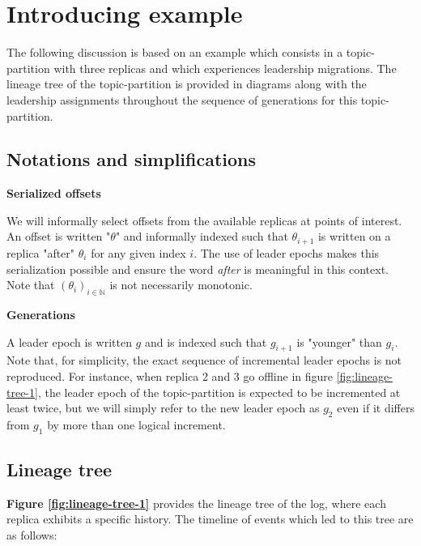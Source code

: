\documentclass{article}
\begin{document}
\section{Introducing example}

The following discussion is based on an example which consists in a topic-partition with three replicas and which experiences leadership migrations. The lineage tree of the topic-partition is provided in diagrams along with the leadership assignments throughout the sequence of generations for this topic-partition.

\subsection{Notations and simplifications}

\textbf{Serialized offsets}

We will informally select offsets from the available replicas at points of interest. An offset is written "$\theta$" and informally indexed such that $\theta_{i+1}$ is written on a replica "after" $\theta_i$ for any given index $i$. The use of leader epochs makes this serialization possible and ensure the word \textit{after} is meaningful in this context. Note that $(\theta_i)_{i \in \mathbb{N}}$ is not necessarily monotonic. 

\textbf{Generations}

A leader epoch is written $g$ and is indexed such that $g_{i+1}$ is "younger" than $g_i$. Note that, for simplicity, the exact sequence of incremental leader epochs is not reproduced. For instance, when replica 2 and 3 go offline in figure \ref{fig:lineage-tree-1}, the leader epoch of the topic-partition is expected to be incremented at least twice, but we will simply refer to the new leader epoch as $g_2$ even if it differs from $g_1$ by more than one logical increment.

\subsection{Lineage tree}

\label{lineage_tree}
\textbf{Figure \ref{fig:lineage-tree-1}} provides the lineage tree of the log, where each replica exhibits a specific history.
The timeline of events which led to this tree are as follows:
\end{document}
